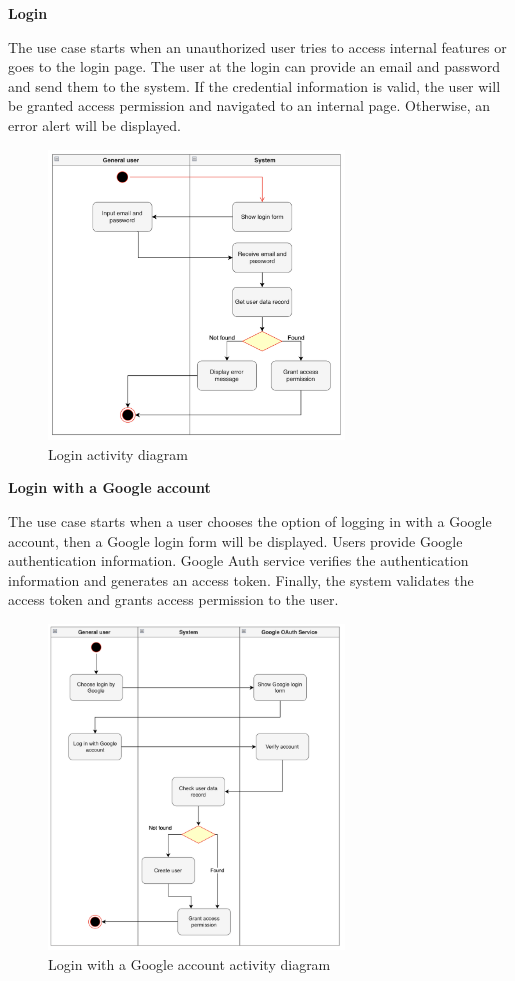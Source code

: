 \textbf{Login}

The use case starts when an unauthorized user tries to access internal features or goes to the login page. The user at the login can provide an email and password and send them to the system. If the credential information is valid, the user will be granted access permission and navigated to an internal page. Otherwise, an error alert will be displayed.

\begin{figure}[H]
  \centering
  \includegraphics[width=0.7\textwidth]{Figures/login.png}
  \caption{Login activity diagram}
  \label{fig:login}
\end{figure}

\textbf{Login with a Google account}

The use case starts when a user chooses the option of logging in with a Google account, then a Google login form will be displayed. Users provide Google authentication information. Google Auth service verifies the authentication information and generates an access token. Finally, the system validates the access token and grants access permission to the user.

\begin{figure}[H]
  \centering
  \includegraphics[width=0.7\textwidth]{Figures/login_gg.png}
  \caption{Login with a Google account activity diagram}
  \label{fig:login-google}
\end{figure}


